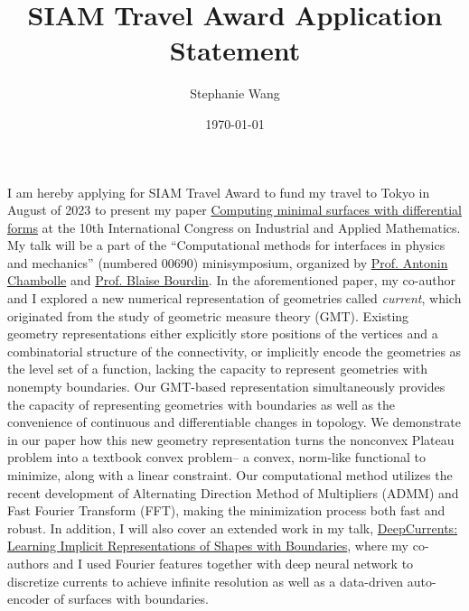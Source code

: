 \documentclass[12pt,a4paper]{article}
\title{SIAM Travel Award Application Statement}
\author{Stephanie Wang}
\date{\today}
\begin{document}
I am hereby applying for SIAM Travel Award to fund my travel to Tokyo in August of 2023 to present my paper \href{https://dl.acm.org/doi/10.1145/3450626.3459781}{Computing minimal surfaces with differential forms} at the 10th International Congress on Industrial and Applied Mathematics.  
My talk will be a part of the ``Computational methods for interfaces in physics and mechanics'' (numbered 00690) minisymposium, organized by \href{http://www.cmap.polytechnique.fr/~antonin/}{Prof. Antonin Chambolle} and \href{https://ms.mcmaster.ca/~bourdinb/}{Prof. Blaise Bourdin}.  
In the aforementioned paper, my co-author and I explored a new numerical representation of geometries called \emph{current}, which originated from the study of geometric measure theory (GMT).  
Existing geometry representations either explicitly store positions of the vertices and a combinatorial structure of the connectivity, or implicitly encode the geometries as the level set of a function, lacking the capacity to represent geometries with nonempty boundaries.  
Our GMT-based representation simultaneously provides the capacity of representing geometries with boundaries as well as the convenience of continuous and differentiable changes in topology.  
We demonstrate in our paper how this new geometry representation turns the nonconvex Plateau problem into a textbook convex problem-- a convex, norm-like functional to minimize, along with a linear constraint.  
Our computational method utilizes the recent development of Alternating Direction Method of Multipliers (ADMM) and Fast Fourier Transform (FFT), making the minimization process both fast and robust.  
In addition, I will also cover an extended work in my talk, \href{https://openaccess.thecvf.com/content/CVPR2022/papers/Palmer_DeepCurrents_Learning_Implicit_Representations_of_Shapes_With_Boundaries_CVPR_2022_paper.pdf}{DeepCurrents: Learning Implicit Representations of Shapes with Boundaries}, where my co-authors and I used Fourier features together with deep neural network to discretize currents to achieve infinite resolution as well as a data-driven auto-encoder of surfaces with boundaries. 
\end{document}
